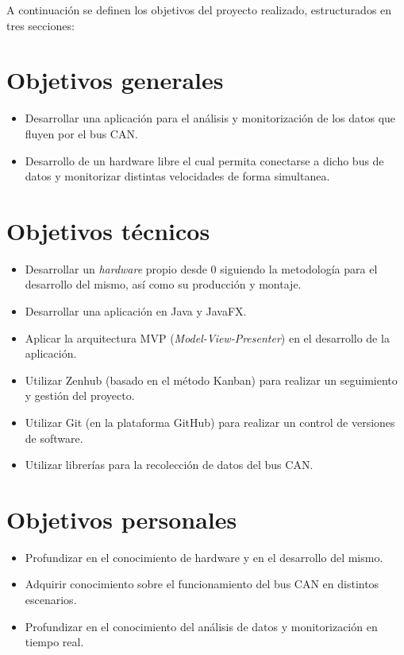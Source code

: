 
A continuación se definen los objetivos del proyecto realizado, estructurados en tres secciones:


\section{Objetivos generales}\label{objetivos-generales}

\begin{itemize}
\tightlist
\item
  Desarrollar una aplicación para el análisis y monitorización de  los datos que fluyen por el bus CAN.
\item
  Desarrollo de un hardware libre el cual permita conectarse a dicho bus de datos y monitorizar distintas velocidades de forma simultanea.

  
\end{itemize}

\section{Objetivos técnicos}\label{objetivos-tecnicos}

\begin{itemize}
\tightlist
\item
  Desarrollar un \emph{hardware} propio desde 0 siguiendo la metodología para el desarrollo del mismo, así como su producción y montaje.
\item
  Desarrollar una aplicación en Java y JavaFX.
\item
  Aplicar la arquitectura MVP (\emph{Model-View-Presenter}) en el
  desarrollo de la aplicación.
\item
  Utilizar Zenhub (basado en el método Kanban) para realizar un seguimiento y gestión del proyecto.
\item
  Utilizar Git (en la plataforma GitHub) para realizar un control de versiones de software.
\item
  Utilizar librerías para la recolección de datos del bus CAN.
\end{itemize}

\section{Objetivos personales}\label{objetivos-personales}

\begin{itemize}
\tightlist
\item
  Profundizar en el conocimiento de hardware y en el desarrollo del mismo.
\item
  Adquirir conocimiento sobre el funcionamiento del bus CAN en distintos escenarios.
\item
  Profundizar en el conocimiento del análisis de datos y monitorización en tiempo real.

\end{itemize}